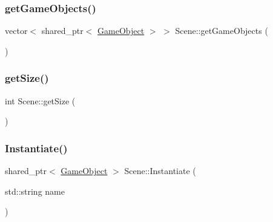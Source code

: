 \hypertarget{class_mason_1_1_scene_a045d786fa6f11ab01e190971637b15ce}{}\label{class_mason_1_1_scene_a045d786fa6f11ab01e190971637b15ce} 
\subsubsection{\texorpdfstring{get\+Game\+Objects()}{getGameObjects()}}
{\footnotesize\ttfamily vector$<$ shared\+\_\+ptr$<$ \hyperlink{class_mason_1_1_game_object}{Game\+Object} $>$ $>$ Scene\+::get\+Game\+Objects (\begin{DoxyParamCaption}{ }\end{DoxyParamCaption})}

\hypertarget{class_mason_1_1_scene_a97780dbb825e92c62b02623fe1e297fa}{}\label{class_mason_1_1_scene_a97780dbb825e92c62b02623fe1e297fa} 
\subsubsection{\texorpdfstring{get\+Size()}{getSize()}}
{\footnotesize\ttfamily int Scene\+::get\+Size (\begin{DoxyParamCaption}{ }\end{DoxyParamCaption})}

\hypertarget{class_mason_1_1_scene_a3eee172075ff2b845caffc8e641f9d9c}{}\label{class_mason_1_1_scene_a3eee172075ff2b845caffc8e641f9d9c} 
\subsubsection{\texorpdfstring{Instantiate()}{Instantiate()}}
{\footnotesize\ttfamily shared\+\_\+ptr$<$ \hyperlink{class_mason_1_1_game_object}{Game\+Object} $>$ Scene\+::\+Instantiate (\begin{DoxyParamCaption}\item[{std\+::string}]{name }\end{DoxyParamCaption})\hspace{0.3cm}{\ttfamily [static]}}

\hypertarget{class_mason_1_1_scene_a4d1afc4d112079aedd3829a8a42e902e}{}\label{class_mason_1_1_scene_a4d1afc4d112079aedd3829a8a42e902e} 
